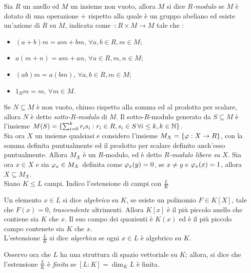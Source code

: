         \begin{definizione}
            Sia $R$ un anello ed $M$ un insieme non vuoto, allora $M$ si dice $R$\emph{-modulo} se $M$ è dotato di una operazione $+$ rispetto alla quale è un gruppo abeliano 
            ed esiste un'azione di $R$ su $M$, indicata come $\cdot: R \times M \to M$ tale che :
            \begin{itemize}
                \item $(a+b)m = am + bm,\,\forall a,b \in R, m \in M$;
                \item $a(m+n) = am + an, \, \forall a \in R, m,n \in M$;
                \item $(ab)m = a(bm), \, \forall a,b \in R, m \in M$;
                \item $1_R m = m, \, \forall m \in M$.
            \end{itemize}
        \end{definizione}
        Se $N \subseteq M$ è non vuoto, chiuso rispetto alla somma ed al prodotto per scalare, allora $N$ è detto \emph{sotto-}$R$\emph{-modulo} di $M$. Il sotto-$R$-modulo 
        generato da $S \subseteq M$ è l'insieme $M(S) = \{\sum_{i=0}^k r_is_i : r_i \in R, s_i \in S \, \forall i \leq k, k \in \mathbb{N}\}$.\\
        Sia ora $X$ un insieme qualsiasi e considero l'insieme $M_X = \{\varphi : X \to R \}$, con la somma definita puntualmente ed il prodotto per scalare definito anch'esso puntualmente. 
        Allora $M_X$ è un $R$-modulo, ed è detto $R$\emph{-modulo libero su} $X$. Sia ora $x \in X$ e sia $\varphi_x \in M_X$ definita come $\varphi_x(y) = 0$, se $x \neq y$ e $\varphi_x(x) = 1$, 
        allora $X \subseteq M_X$. \\
        Siano $K \leq L$ campi. Indico l'estensione di campi con $\frac{L}{K}$
        \begin{definizione}
            Un elemento $x \in L$ si dice \emph{algebrico} su $K$, se esiste un polinomio $F \in K[X]$, tale che $F(x) = 0$, \emph{trascendente} altrimenti. Allora $K[x]$ è il più piccolo 
            anello che contiene sia $K$ che $x$. Il suo campo dei quozienti è $K(x)$ ed è il più piccolo campo contenete sia $K$ che $x$.\\
            L'estensione $\frac{L}{K}$ si dice \emph{algerbica} se ogni $x \in L$ è algebrico su $K$.
        \end{definizione}
        Osservo ora che $L$ ha una struttura di spazio vettoriale su $K$; allora, si dice che l'estensione $\frac{L}{K}$ è \emph{finita} se $[L:K] = \dim_KL$ è finita.
